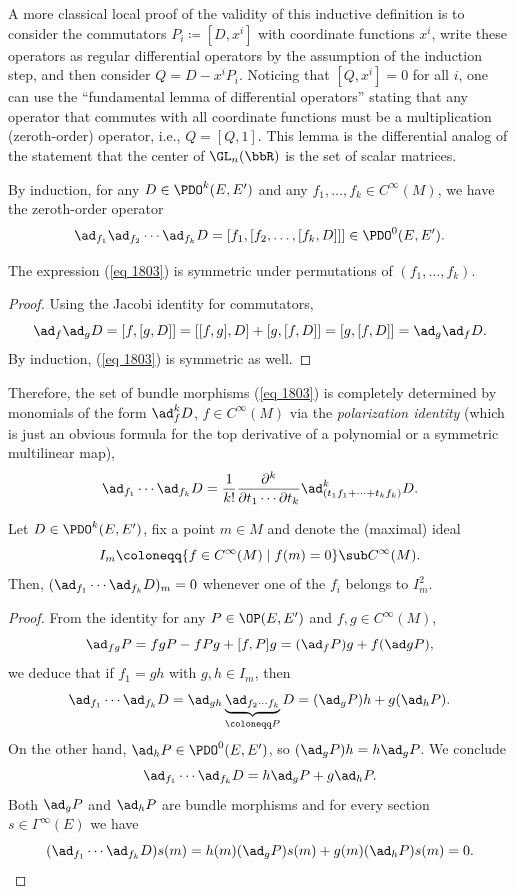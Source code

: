 \begin{rem}
    A more classical local proof of the validity of this inductive definition is to consider the commutators $P_i\coloneqq [D,x^i]$ with coordinate functions $x^i$, write these operators as regular differential operators by the assumption of the induction step, and then consider $Q=D-x^iP_i$. Noticing that $[Q,x^i]=0$ for all $i$, one can use the ``fundamental lemma of differential operators'' stating that any operator that commutes with all coordinate functions must be a multiplication (zeroth-order) operator, i.e.,  $Q=[Q,1]$. This lemma is the differential analog of the statement that the center of $\GL_n(\bbR)$ is the set of scalar matrices.
\end{rem}

By induction, for any $D\in\PDO^k(E,E')$ and any $f_1,\ldots,f_k\in C^\infty(M)$, we have the zeroth-order operator
\[\ad_{f_1}\ad_{f_2}\cdots \ad_{f_k} D=[f_1,[f_2,\ldots,[f_k,D]]]\in \PDO^0(E,E').\label{eq 1803}\]

\begin{lem}
    The expression (\ref{eq 1803}) is symmetric under permutations of $(f_1,\ldots,f_k)$.
\end{lem}
\begin{proof}
    Using the Jacobi identity for commutators,
    \[\ad_f\ad_g D=[f,[g,D]]=[[f,g],D]+[g,[f,D]]=[g,[f,D]]=\ad_g\ad_f D.\]
    By induction, (\ref{eq 1803}) is symmetric as well.
\end{proof}

Therefore, the set of bundle morphisms (\ref{eq 1803}) is completely determined by monomials of the form $\ad_f^k D$, $f\in C^\infty(M)$ via the \emph{polarization identity} (which is just an obvious formula for the top derivative of a polynomial or a symmetric multilinear map),
\[\ad_{f_1}\cdots \ad_{f_k}D=\frac{1}{k!}\frac{\partial^k}{\partial t_1\cdots \partial t_k}\ad_{(t_1f_1+\cdots+t_kf_k)}^k D.\]

\begin{lem}
    Let $D\in\PDO^k(E,E')$, fix a point $m\in M$ and denote the (maximal) ideal 
    \[I_m\coloneqq \{f\in C^\infty(M)\mid f(m)=0\}\sub C^\infty(M).\]
    Then, $(\ad_{f_1}\cdots \ad_{f_k}D)_m=0$ whenever one of the $f_i$ belongs to $I^2_m$.
\end{lem}
\begin{proof}
    From the identity for any $P\in \OP(E,E')$ and $f,g\in C^\infty(M)$,
    \[\ad_{fg}P=fgP-fPg+[f,P]g=(\ad_f P)g+f(\ad gP),\]
    we deduce that if $f_1=gh$ with $g,h\in I_m$, then 
    \[\ad_{f_1}\cdots \ad_{f_k}D=\ad_{gh}\underbrace{\ad_{f_2\cdots f_k}}_{\coloneqq P}D=(\ad_g P)h+g(\ad_h P).\]
    On the other hand, $\ad_h P\in\PDO^0(E,E')$, so $(\ad_g P)h=h\ad_g P$. We conclude 
    \[\ad_{f_1}\cdots \ad_{f_k}D=h\ad_g P+g\ad_h P.\]
    Both $\ad_g P$ and $\ad_h P$ are bundle morphisms and for every section $s\in\Gamma^\infty(E)$ we have 
    \[(\ad_{f_1}\cdots \ad_{f_k}D)s(m)=h(m)(\ad_g P)s(m)+g(m)(\ad_h P)s(m)=0.\]
\end{proof}

